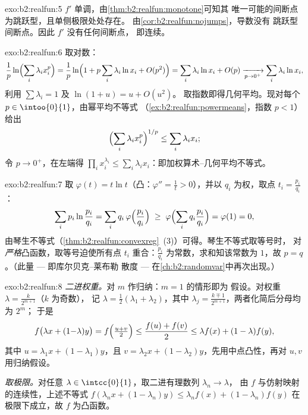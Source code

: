 \begin{solution}{exo:b2:realfun:5}
$f'$ 单调，由\cref{thm:b2:realfun:monotone}可知其
唯一可能的间断点为跳跃型，且单侧极限处处存在。
由\cref{cor:b2:realfun:nojumps}，导数没有
跳跃型间断点。因此 $f'$ 没有任何间断点，
即连续。
\end{solution}

\begin{solution}{exo:b2:realfun:6}
取对数：
\[
\frac1p \ln\Bigl(\sum_i \lambda_i x_i^p\Bigr)
= \frac1p \ln\Bigl(1 + p\sum_i \lambda_i \ln x_i +
O(p^2)\Bigr)
= \sum_i \lambda_i \ln x_i + O(p)
\xrightarrow[p \to 0^+]{} \sum_i \lambda_i \ln x_i ,
\]
利用 $\sum\lambda_i = 1$ 及 $\ln(1 + u) = u + O(u^2)$。
取指数即得几何平均。现对每个 $p \in
\intoo{0}{1}$，由幂平均不等式
（\cref{ex:b2:realfun:powermeans}，指数 $p < 1$）给出
\[
\Bigl(\sum_i \lambda_i x_i^p\Bigr)^{1/p} \leq \sum_i\lambda_i x_i ;
\]
令 $p \to 0^+$，在左端得 $\prod_i x_i^{\lambda_i}
\leq \sum_i \lambda_i x_i$：即加权算术--几何平均不等式。
\end{solution}

\begin{solution}{exo:b2:realfun:7}
取 $\varphi(t) = t\ln t$（凸：$\varphi'' = \frac1t > 0$），并以
$q_i$ 为权，取点 $t_i = \frac{p_i}{q_i}$：
\[
\sum_i p_i \ln\frac{p_i}{q_i}
= \sum_i q_i\, \varphi\Bigl(\frac{p_i}{q_i}\Bigr)
\;\geq\; \varphi\Bigl(\sum_i q_i \frac{p_i}{q_i}\Bigr)
= \varphi(1) = 0 ,
\]
由琴生不等式（\cref{thm:b2:realfun:convexreg}~(3)）可得。琴生不等式取等号时，
对\emph{严格}凸函数，取等号迫使所有点
$t_i$ 重合：$\frac{p_i}{q_i}$ 为常数，求和知该常数为
$1$，故 $p = q$。（此量 --- 即库尔贝克--莱布勒
散度 --- 在\cref{ch:b2:randomvar}中再次出现。）
\end{solution}

\begin{solution}{exo:b2:realfun:8}
\emph{二进权重。}对 $m$ 作归纳：$m = 1$ 的情形即为
假设。对权重 $\lambda = \frac{k}{2^{m+1}}$（$k$ 为奇数），
记 $\lambda = \frac12(\lambda_1 + \lambda_2)$，其中 $\lambda_j =
\frac{k \mp 1}{2^{m+1}}$，两者化简后分母均为 $2^m$；
于是
\[
f\bigl(\lambda x + (1{-}\lambda)y\bigr)
= f\Bigl(\tfrac{u + v}{2}\Bigr)
\leq \frac{f(u) + f(v)}{2}
\leq \lambda f(x) + (1 - \lambda) f(y),
\]
其中 $u = \lambda_1 x + (1 - \lambda_1)y$，且 $v = \lambda_2 x +
(1-\lambda_2)y$，先用中点凸性，再对
$u, v$ 用归纳假设。

\emph{取极限。}对任意 $\lambda \in
\intcc{0}{1}$，取二进有理数列 $\lambda_n \to \lambda$，
由 $f$ 与仿射映射的连续性，上述不等式
$f(\lambda_n x + (1-\lambda_n)y) \leq \lambda_n f(x) +
(1-\lambda_n)f(y)$ 在极限下成立，故 $f$ 为凸函数。
\end{solution}

